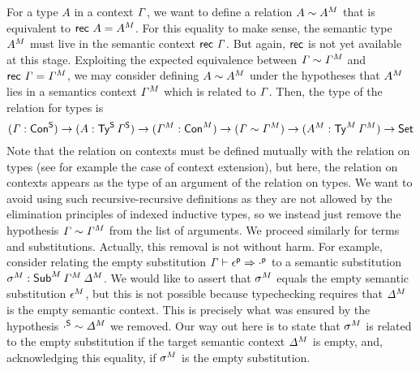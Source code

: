For a type $A$ in a context $\mathit{\Gamma}$, we want to define a relation
$A\sim {A}^M$ that is equivalent to $\mathsf{rec}\,\,A={A}^M$.
For this equality to make sense, the semantic type ${A}^M$ must live
in the semantic context $\mathsf{rec}\,\,\mathit{\Gamma}$. But again, $\mathsf{rec}$ is not
yet available at this stage. Exploiting the expected equivalence between
$\mathit{\Gamma}\sim{\mathit{\Gamma}}^M$ and $\mathsf{rec}\,\,\mathit{\Gamma}={\mathit{\Gamma}}^M$, we may consider defining $A\sim{A}^M$ under the
hypotheses that ${A}^M$ lies in a semantics context ${\mathit{\Gamma}}^M$ which is
related to $\mathit{\Gamma}$. Then, the type of the relation for types is
\[
  (\mathit{\Gamma} : {\mathsf{Con}}^{\mathsf{S}})\rightarrow (A : {\mathsf{Ty}}^{\mathsf{S}}\,{\mathit{\Gamma}}^{\mathsf{S}}) \rightarrow
  ({\mathit{\Gamma}}^M : {\mathsf{Con}}^M)
  \rightarrow
  (\mathit{\Gamma} \sim {\mathit{\Gamma}}^M)
  \rightarrow
  ({A}^M:{\mathsf{Ty}}^M\,{\mathit{\Gamma}}^M)
  \rightarrow
  \mathsf{Set}
\]
Note that the relation on contexts
must be defined mutually with the relation on types (see for example the case of
context extension), but here, the relation on contexts appears as the type of an
argument of the relation on types.
We want to avoid using such recursive-recursive
definitions as they are not allowed by the elimination principles of indexed inductive types, so we instead just remove the hypothesis
$\mathit{\Gamma}\sim{\mathit{\Gamma}}^M$ from the list of arguments.  We proceed similarly for
terms and substitutions. Actually, this removal is not without harm. For
example, consider relating the empty substitution
$\mathit{\Gamma}\vdash {\epsilon}^{\mathsf{p}} \Rightarrow {\cdot}^{\mathsf{p}} $ to a semantic substitution
${\sigma}^M : {\mathsf{Sub}}^M\,{\mathit{\Gamma}}^M\,{\mathit{\Delta}}^M$. We would like to assert
that ${\sigma}^M$ equals the empty semantic substitution ${\epsilon}^M$, but
this is not possible because typechecking requires that ${\mathit{\Delta}}^M$ is the
empty semantic context. This is precisely what was ensured by the hypothesis
${\cdot}^{\mathsf{S}} \sim {\mathit{\Delta}}^M$ we removed.  Our way out here is to state that ${\sigma}^M$
is related to the empty substitution if the target semantic context ${\mathit{\Delta}}^M$
is empty, and, acknowledging this equality, if ${\sigma}^M$ is the empty
substitution.

